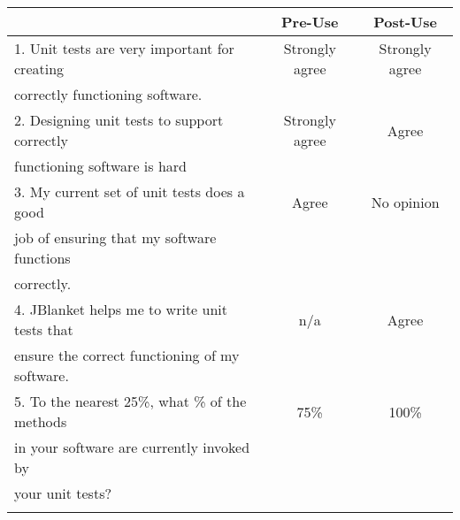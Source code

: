 \begin{tabular}{lcc} \\
 & {\bf Pre-Use} & {\bf Post-Use} \\ \hline
1. Unit tests are very important for creating & Strongly agree & Strongly agree \\
   correctly functioning software. \\ \hline

2. Designing unit tests to support correctly & Strongly agree & Agree \\
   functioning software is hard\\ \hline

3. My current set of unit tests does a good & Agree & No opinion \\
   job of ensuring that my software functions \\
   correctly.\\ \hline

4. JBlanket helps me to write unit tests that & n/a & Agree \\
   ensure the correct functioning of my software.\\ \hline

5. To the nearest 25\%, what \% of the methods & 75\% & 100\% \\
   in your software are currently invoked by \\
   your unit tests?\\ \hline
\\
\end{tabular}

